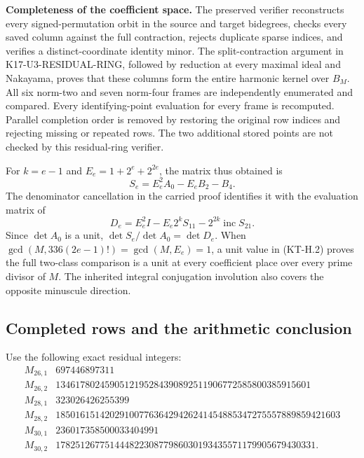 \documentclass[11pt,a4paper]{article}
\theoremstyle{definition}
\renewcommand{\paragraph}[1]{\par\smallskip\noindent\textbf{#1}\quad\ignorespaces}
\begin{document}
\paragraph{Completeness of the coefficient space.}
The preserved verifier reconstructs every signed-permutation
orbit in the source and target bidegrees, checks every saved
column against the full contraction, rejects duplicate sparse
indices, and verifies a distinct-coordinate identity minor.
The split-contraction argument in K17-U3-RESIDUAL-RING, followed
by reduction at every maximal ideal and Nakayama, proves that
these columns form the entire harmonic kernel over $B_M$.
All six norm-two and seven norm-four frames are independently
enumerated and compared.  Every identifying-point evaluation
for every frame is recomputed.  Parallel completion order is
removed by restoring the original row indices and rejecting
missing or repeated rows.  The two additional stored points are
not checked by this residual-ring verifier.

For $k=e-1$ and $E_e=1+2^e+2^{2e}$, the matrix thus obtained is
\[
 S_e=E_e^2A_0-E_eB_2-B_4.
\]
The denominator cancellation in the carried proof identifies it
with the evaluation matrix of
\[
 D_e=E_e^2I-E_e2^kS_{11}-2^{2k}\operatorname{inc}S_{21}.
                                                        \tag{KT-H.2}
\]
Since $\det A_0$ is a unit, $\det S_e/\det A_0=\det D_e$.
When $\gcd(M,336(2e-1)!)=\gcd(M,E_e)=1$, a unit value in
(KT-H.2) proves the full two-class comparison is a unit at every
coefficient place over every prime divisor of $M$.  The inherited
integral conjugation involution also covers the opposite
minuscule direction.

\subsection{Completed rows and the arithmetic conclusion}

Use the following exact residual integers:
\[
\begin{array}{c|r}
 M_{26,1}&697446897311\\
 M_{26,2}&1346178024590512195284390892511906772585800385915601\\
 M_{28,1}&323026426255399\\
 M_{28,2}&1850161514202910077636429426241454885347275557889859421603\\
 M_{30,1}&236017358500033404991\\
 M_{30,2}&17825126775144482230877986030193435571179905679430331.
\end{array}                                             \tag{KT-H.3}
\]
\end{document}
